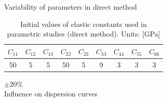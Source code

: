 \documentclass[10pt,aspectratio=169]{beamer} %
\begin{document}
\begin{frame}[t,label=frame30a]{Variability of parameters in \alert{direct method}}
\begin{table}[h!]
	\renewcommand{\arraystretch}{1.1}
	\caption{Initial values of elastic constants used in parametric studies (direct method). 
		Units: [GPa]}
	\label{tab:Ctensor_initial}
	\begin{center}
		\begin{tabular}{ccccccccc} 
			\toprule
			\(C_{11}\) & \(C_{12}\) & \(C_{13}\)  & \(C_{22}\) & \(C_{23}\) & \(C_{33}\) & 
			\(C_{44}\)  & \(C_{55}\) & \(C_{66}\) \\
			\midrule
			50 &5& 5&  50 & 5 & 9 & 3 & 3 & 3\\
			\bottomrule 
		\end{tabular} 
	\end{center}
\end{table}
	\vspace{10pt}
	\centering
	\Large $\pm$20\%\\ 
	\vspace{10pt}
	\normalsize Influence on dispersion curves
\end{frame}
\end{document}
